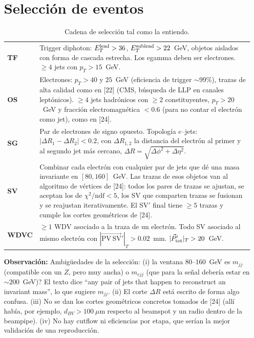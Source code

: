 \documentclass[11pt,a4paper]{article}
\newcommand{\PVSV}{\overrightarrow{\mathrm{PV\,SV}}}
\newcommand{\obs}[1]{\par\smallskip\noindent\colorbox{orange!12}{\parbox{\dimexpr\linewidth-2\fboxsep}{\small\textbf{Observación:} #1}}\par\smallskip}
\begin{document}
\section{Selección de eventos}
\begin{table}[h]
\centering
\small
\begin{tabular}{>{\bfseries}l p{12cm}}
\toprule
TF & Trigger diphoton: $E_T^{\rm lead}>36$, $E_T^{\rm sublead}>22$~GeV, objetos aislados con forma de cascada estrecha. Los egamma deben ser electrones. $\geq 4$ jets con $p_T>15$~GeV.\\
OS & Electrones: $p_T>40$ y $25$~GeV (eficiencia de trigger $\sim$99\%), trazas de alta calidad como en [22] (CMS, búsqueda de LLP en canales leptónicos). $\geq4$ jets hadrónicos con $\geq2$ constituyentes, $p_T>20$~GeV y fracción electromagnética $<0.6$ (para no contar el electrón como jet), como en [24].\\
SG & Par de electrones de signo opuesto. Topología $e$--jets: $|\Delta R_1-\Delta R_2|<0.2$, con $\Delta R_{1,2}$ la distancia del electrón al primer y al segundo jet más cercano, $\Delta R=\sqrt{\Delta\phi^2+\Delta\eta^2}$.\\
SV & Combinar cada electrón con cualquier par de jets que dé una masa invariante en $[80,160]$~GeV. Las trazas de esos objetos van al algoritmo de vértices de [24]: todos los pares de trazas se ajustan, se aceptan los de $\chi^2/\mathrm{ndf}<5$, los SV que comparten trazas se fusionan y se reajustan iterativamente. El SV$'$ final tiene $\geq5$ trazas y cumple los cortes geométricos de [24].\\
WDVC & $\geq1$ WDV asociado a la traza de un electrón. Todo SV asociado al mismo electrón con $|\PVSV'|_{T}>0.02$~mm. $|\vec P'_{\rm tot}|_T>20$~GeV.\\
\bottomrule
\end{tabular}
\caption{Cadena de selección tal como la entiendo.}
\end{table}

\obs{Ambigüedades de la selección: (i) la ventana 80--160~GeV \textquestiondown{}es $m_{jj}$ (compatible con un $Z$, pero muy ancha) o $m_{ejj}$ (que para la señal debería estar en $\sim200$~GeV)? El texto dice ``any pair of jets that happen to reconstruct an invariant mass'', lo que sugiere $m_{jj}$. (ii) El corte $\Delta R$ está escrito de forma algo confusa. (iii) No se dan los cortes geométricos concretos tomados de [24] (allí había, por ejemplo, $d_{BV}>100~\mu$m respecto al beamspot y un radio dentro de la beampipe). (iv) No hay cutflow ni eficiencias por etapa, que serían la mejor validación de una reproducción.}
\end{document}
